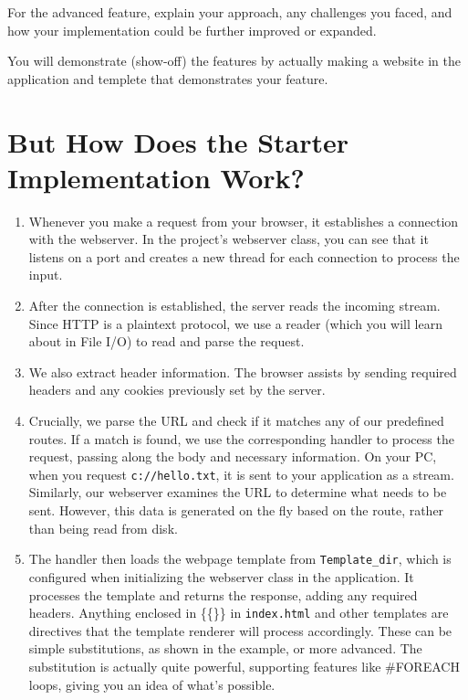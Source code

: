 \documentclass{article}
\begin{document}
For the advanced feature, explain your approach, any challenges you faced, and how your implementation could be further improved or expanded.

You will demonstrate (show-off) the features by actually making a website in the application and templete that demonstrates your feature.


\section{But How Does the Starter Implementation Work?} \begin{enumerate} 
    \item Whenever you make a request from your browser, it establishes a connection with the webserver. In the project's webserver class, you can see that it listens on a port and creates a new thread for each connection to process the input. 
    \item After the connection is established, the server reads the incoming stream. Since HTTP is a plaintext protocol, we use a reader (which you will learn about in File I/O) to read and parse the request. 
    \item We also extract header information. The browser assists by sending required headers and any cookies previously set by the server. 
    \item Crucially, we parse the URL and check if it matches any of our predefined routes. If a match is found, we use the corresponding handler to process the request, passing along the body and necessary information. On your PC, when you request 
    \texttt{c://hello.txt}, it is sent to your application as a stream. Similarly, our webserver examines the URL to determine what needs to be sent. However, this data is generated on the fly based on the route, rather than being read from disk. 
    \item The handler then loads the webpage template from \texttt{Template\_dir}, which is configured when initializing the webserver class in the application. It processes the template and returns the response, adding any required headers. Anything enclosed in \{\{\}\} in \texttt{index.html} and other templates are directives that the template renderer will process accordingly. These can be simple substitutions, as shown in the example, or more advanced. The substitution is actually quite powerful, supporting features like \#FOREACH loops, giving you an idea of what's possible.

\end{enumerate}
\end{document}
